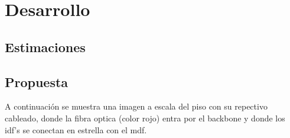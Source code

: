 \documentclass[letterpaper]{article}
\begin{document}
\newpage{}


\section{Desarrollo}\label{sec:ana}




\subsection{Estimaciones}\label{sec:sc}



\subsection{Propuesta}\label{sec:pro}



A continuación se muestra una imagen a escala del piso con
su repectivo cableado, donde la fibra optica (color rojo)
entra por el backbone y donde los  \acrshort{idf}'s se
conectan en estrella con el \acrshort{mdf}.




\newpage{}

\printglossary[type=\acronymtype]

\printglossary{}

\newpage{}

\listoftables
\listoffigures
\end{document}
